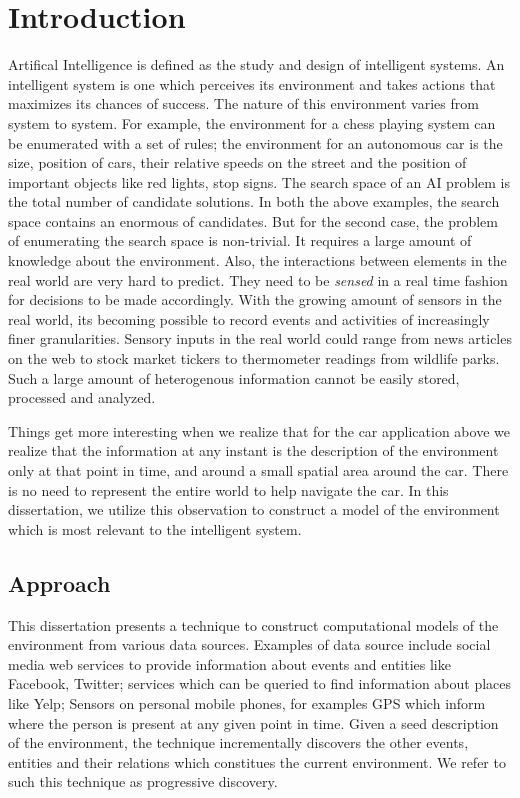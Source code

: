 \chapter{Introduction}

Artifical Intelligence is defined as the study and design of intelligent systems. An intelligent system is one which perceives its environment and takes actions that maximizes its chances of success. The nature of this environment varies from system to system. For example, the environment for a chess playing system can be enumerated with a set of rules; the environment for an autonomous car is the size, position of cars, their relative speeds on the street and the position of important objects like red lights, stop signs. The search space of an AI problem is the total number of candidate solutions. In both the above examples, the search space contains an enormous of candidates. But for the second case, the problem of enumerating the search space is non-trivial. It requires a large amount of knowledge about the environment. Also, the interactions between elements in the real world are very hard to predict. They need to be \textit{sensed} in a real time fashion for decisions to be made accordingly. With the growing amount of sensors in the real world, its becoming possible to record events and activities of increasingly finer granularities. Sensory inputs in the real world could range from news articles on the web to stock market tickers to thermometer readings from wildlife parks. Such a large amount of heterogenous information cannot be easily stored, processed and analyzed. 

Things get more interesting when we realize that for the car application above we realize that the information at any instant is the description of the environment only at that point in time, and around a small spatial area around the car. There is no need to represent the entire world to help navigate the car. In this dissertation, we utilize this observation to construct a model of the environment which is most relevant to the intelligent system.

\section{Approach}
This dissertation presents a technique to construct computational models of the environment from various data sources. Examples of data source include social media web services to provide information about events and entities like Facebook, Twitter; services which can be queried to find information about places like Yelp; Sensors on personal mobile phones, for examples GPS which inform where the person is present at any given point in time. Given a seed description of the environment, the technique incrementally discovers the other events, entities and their relations which constitues the current environment. We refer to such this technique as progressive discovery. 

